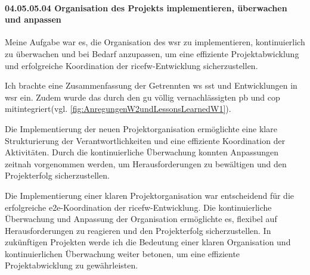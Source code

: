 \paragraph*{04.05.05.04  Organisation des Projekts implementieren, überwachen und anpassen
}
\label{para:04.05.05.04_OrganisationDesProjektsImplementierenUeberwachenUndAnpassen}

\par Meine Aufgabe war es, die Organisation des \gls{wsr} zu implementieren, kontinuierlich zu überwachen und bei Bedarf anzupassen, um eine effiziente Projektabwicklung und erfolgreiche Koordination der \gls{ricefw}-Entwicklung sicherzustellen.

\par Ich brachte eine Zusammenfassung der Getrennten \gls{ws} \gls{sst} und Entwicklungen in \gls{wsr} ein. Zudem wurde das durch den \gls{gu} völlig vernachlässigten \gls{pb} und \gls{cop} mitintegriert(vgl. \autoref{fig:AnregungenW2undLessonsLearnedW1}).

\par Die Implementierung der neuen Projektorganisation ermöglichte eine klare Strukturierung der Verantwortlichkeiten und eine effiziente Koordination der Aktivitäten. Durch die kontinuierliche Überwachung konnten Anpassungen zeitnah vorgenommen werden, um Herausforderungen zu bewältigen und den Projekterfolg sicherzustellen.

\par Die Implementierung einer klaren Projektorganisation war entscheidend für die erfolgreiche \gls{e2e}-Koordination der \gls{ricefw}-Entwicklung. Die kontinuierliche Überwachung und Anpassung der Organisation ermöglichte es, flexibel auf Herausforderungen zu reagieren und den Projekterfolg sicherzustellen. In zukünftigen Projekten werde ich die Bedeutung einer klaren Organisation und kontinuierlichen Überwachung weiter betonen, um eine effiziente Projektabwicklung zu gewährleisten.
